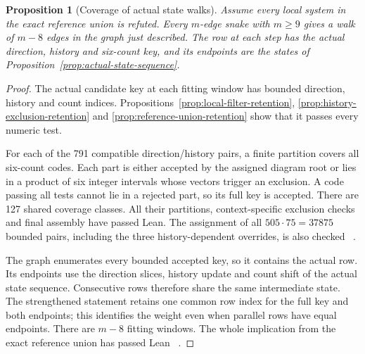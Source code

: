 \documentclass[11pt,a4paper]{article}
\newtheorem{proposition}[theorem]{Proposition}
\theoremstyle{definition}
\theoremstyle{remark}
\begin{document}
\begin{proposition}[Coverage of actual state walks]\label{prop:defined-graph-walk}
Assume every local system in the exact reference union is refuted. Every
$m$-edge snake with $m\ge9$ gives a walk of $m-8$ edges in the graph just
described. The row at each step has the actual direction, history and
six-count key, and its endpoints are the states of
Proposition~\ref{prop:actual-state-sequence}.
\end{proposition}
\begin{proof}
The actual candidate key at each fitting window has bounded direction,
history and count indices. Propositions~\ref{prop:local-filter-retention},
\ref{prop:history-exclusion-retention} and
\ref{prop:reference-union-retention} show that it passes every numeric test.

For each of the 791 compatible direction/history pairs, a finite partition
covers all six-count codes. Each part is either accepted by the assigned
diagram root or lies in a product of six integer intervals whose vectors
trigger an exclusion. A code passing all tests cannot lie in a rejected
part, so its full key is accepted. There are 127 shared coverage classes.
All their partitions, context-specific exclusion checks and final assembly
have passed Lean. The assignment of all $505\cdot75=37875$ bounded pairs,
including the three history-dependent overrides, is also checked
~\cite{graphcoveragearchive,weightintegrationarchive}.

The graph enumerates every bounded accepted key, so it contains the actual
row. Its endpoints use the direction slices, history update and count shift
of the actual state sequence. Consecutive rows therefore share the same
intermediate state. The strengthened statement retains one common row
index for the full key and both endpoints; this identifies the weight even
when parallel rows have equal endpoints. There are $m-8$ fitting windows.
The whole implication from the exact reference union has passed Lean
~\cite{referenceunionarchive}.
\end{proof}
\end{document}
